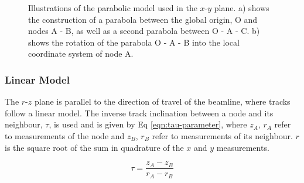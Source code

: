 \begin{figure}[htbp!] 
    \centering
    \hfill%
    \caption{Illustrations of the parabolic model used in the $x$-$y$ plane. a) shows the construction of a parabola between the global origin, O and nodes A - B, as well as a second parabola between O - A - C. b) shows the rotation of the parabola O - A - B into the local coordinate system of node A.}
    \label{fig:gnn-parabolic-model}
\end{figure}


\subsubsection{Linear Model}
\label{linear-state}

The $r$-$z$ plane is parallel to the direction of travel of the beamline, where tracks follow a linear model. The inverse track inclination between a node and its neighbour, $\tau$, is used and is given by Eq \eqref{eqn:tau-parameter}, where $z_A$, $r_A$ refer to measurements of the node and $z_B$, $r_B$ refer to measurements of its neighbour. $r$ is the square root of the sum in quadrature of the $x$ and $y$ measurements.

\begin{equation}
\tau = \frac{z_A - z_B}{r_A - r_B}
\label{eqn:tau-parameter}
\end{equation}

